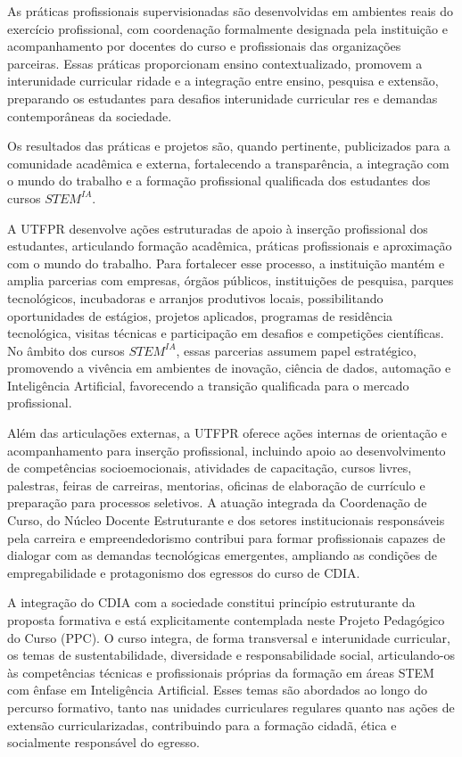 As práticas profissionais supervisionadas são desenvolvidas em ambientes reais do exercício profissional, com coordenação formalmente designada pela instituição e acompanhamento por docentes do curso e profissionais das organizações parceiras. Essas práticas proporcionam ensino contextualizado, promovem a interunidade curricular ridade e a integração entre ensino, pesquisa e extensão, preparando os estudantes para desafios interunidade curricular res e demandas contemporâneas da sociedade.

Os resultados das práticas e projetos são, quando pertinente, publicizados para a comunidade acadêmica e externa, fortalecendo a transparência, a integração com o mundo do trabalho e a formação profissional qualificada dos estudantes dos cursos $STEM^{IA}$.

A UTFPR desenvolve ações estruturadas de apoio à inserção profissional dos estudantes, articulando formação acadêmica, práticas profissionais e aproximação com o mundo do trabalho. Para fortalecer esse processo, a instituição mantém e amplia parcerias com empresas, órgãos públicos, instituições de pesquisa, parques tecnológicos, incubadoras e arranjos produtivos locais, possibilitando oportunidades de estágios, projetos aplicados, programas de residência tecnológica, visitas técnicas e participação em desafios e competições científicas. No âmbito dos cursos $STEM^{IA}$, essas parcerias assumem papel estratégico, promovendo a vivência em ambientes de inovação, ciência de dados, automação e Inteligência Artificial, favorecendo a transição qualificada para o mercado profissional.

Além das articulações externas, a UTFPR oferece ações internas de orientação e acompanhamento para inserção profissional, incluindo apoio ao desenvolvimento de competências socioemocionais, atividades de capacitação, cursos livres, palestras, feiras de carreiras, mentorias, oficinas de elaboração de currículo e preparação para processos seletivos. A atuação integrada da Coordenação de Curso, do Núcleo Docente Estruturante e dos setores institucionais responsáveis pela carreira e empreendedorismo contribui para formar profissionais capazes de dialogar com as demandas tecnológicas emergentes, ampliando as condições de empregabilidade e protagonismo dos egressos do curso de CDIA.

A integração do CDIA com a sociedade constitui princípio estruturante da proposta formativa e está explicitamente contemplada neste Projeto Pedagógico do Curso (PPC). O curso integra, de forma transversal e interunidade curricular, os temas de sustentabilidade, diversidade e responsabilidade social, articulando-os às competências técnicas e profissionais próprias da formação em áreas STEM com ênfase em Inteligência Artificial. Esses temas são abordados ao longo do percurso formativo, tanto nas unidades curriculares regulares quanto nas ações de extensão curricularizadas, contribuindo para a formação cidadã, ética e socialmente responsável do egresso.

